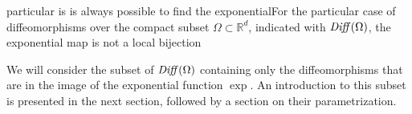 







particular is is always possible to find  the exponentialFor the particular case of diffeomorphisms over the compact subset $\Omega\subset\mathbb{R}^d$, indicated with $\text{\emph{Diff}}(\Omega)$, the exponential map is not a local bijection 

 
We will consider the subset of $\text{\emph{Diff}}(\Omega)$ containing only the diffeomorphisms that are in the image of the exponential function $\exp$. An introduction to this subset is presented in the next section, followed by a section on their parametrization.




